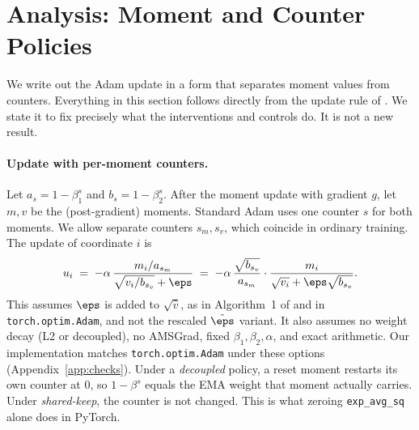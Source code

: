 \section{Analysis: Moment and Counter Policies}
\label{sec:analysis}

We write out the Adam update in a form that separates moment values from counters. Everything in this
section follows directly from the update rule of \citet{kingma2015adam}. We state it to fix precisely
what the interventions and controls do. It is not a new result.

\paragraph{Update with per-moment counters.}
Let $a_s=1-\beta_1^{s}$ and $b_s=1-\beta_2^{s}$. After the moment update with gradient $g$, let $m,v$
be the (post-gradient) moments. Standard Adam uses one counter $s$ for both moments. We allow separate
counters $s_m,s_v$, which coincide in ordinary training. The update of coordinate $i$ is
\begin{equation}
u_i \;=\; -\alpha\,\frac{m_i/a_{s_m}}{\sqrt{v_i/b_{s_v}}+\eps}
      \;=\; -\alpha\,\frac{\sqrt{b_{s_v}}}{a_{s_m}}\cdot\frac{m_i}{\sqrt{v_i}+\eps\sqrt{b_{s_v}}}.
\label{eq:update}
\end{equation}
This assumes $\eps$ is added to $\sqrt{\hat v}$, as in Algorithm~1 of \citet{kingma2015adam} and in
\texttt{torch.optim.Adam}, and not the rescaled $\hat\eps$ variant. It also assumes no weight decay (L2 or
decoupled), no AMSGrad, fixed $\beta_1,\beta_2,\alpha$, and exact arithmetic. Our implementation matches
\texttt{torch.optim.Adam} under these options (Appendix~\ref{app:checks}). Under a \emph{decoupled}
policy, a reset moment restarts its own counter at 0, so $1-\beta^{s}$ equals the EMA weight that moment
actually carries. Under \emph{shared-keep}, the counter is not changed. This is what zeroing
\texttt{exp\_avg\_sq} alone does in PyTorch.

